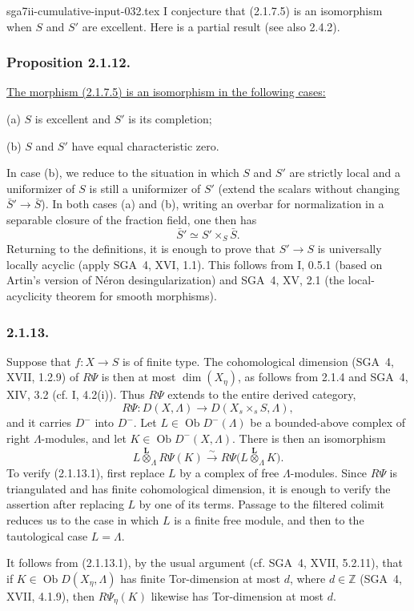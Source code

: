\begin{filecontents*}{sga7ii-cumulative-input-032.tex}
I conjecture that (2.1.7.5) is an isomorphism when $S$ and $S'$ are
excellent.  Here is a partial result (see also 2.4.2).

\subsubsection*{Proposition 2.1.12.}
\underline{The morphism (2.1.7.5) is an isomorphism in the following
cases:}

\medskip
\noindent(a) $S$ is excellent and $S'$ is its completion;

\noindent(b) $S$ and $S'$ have equal characteristic zero.

In case (b), we reduce to the situation in which $S$ and $S'$ are
strictly local and a uniformizer of $S$ is still a uniformizer of
$S'$ (extend the scalars without changing
$\bar S'\longrightarrow\bar S$).  In both cases (a) and (b), writing
an overbar for normalization in a separable closure of the fraction
field, one then has
\[
\bar S'\simeq S'\times_S\bar S.
\]
Returning to the definitions, it is enough to prove that
$S'\longrightarrow S$ is universally locally acyclic (apply SGA~4,
XVI, 1.1).  This follows from I, 0.5.1 (based on Artin's version of
N\'{e}ron desingularization) and SGA~4, XV, 2.1 (the local-acyclicity
theorem for smooth morphisms).

\subsubsection*{2.1.13.}
Suppose that $f:X\longrightarrow S$ is of finite type.  The
cohomological dimension (SGA~4, XVII, 1.2.9) of $R\Psi$ is then at most
$\dim(X_\eta)$, as follows from 2.1.4 and SGA~4, XIV, 3.2 (cf. I,
4.2(i)).  Thus $R\Psi$ extends to the entire derived category,
\[
R\Psi:D(X,\Lambda)\longrightarrow D(X_s\times_sS,\Lambda),
\]
and it carries $D^-$ into $D^-$.  Let
$L\in\operatorname{Ob}D^-(\Lambda)$ be a bounded-above complex of
right $\Lambda$-modules, and let
$K\in\operatorname{Ob}D^-(X,\Lambda)$.  There is then an isomorphism
\begin{equation}\tag{2.1.13.1}
L\overset{\mathbf L}{\otimes}_\Lambda R\Psi(K)
\xrightarrow{\ \sim\ }
R\Psi\bigl(L\overset{\mathbf L}{\otimes}_\Lambda K\bigr).
\end{equation}
To verify (2.1.13.1), first replace $L$ by a complex of free
$\Lambda$-modules.  Since $R\Psi$ is triangulated and has finite
cohomological dimension, it is enough to verify the assertion after
replacing $L$ by one of its terms.  Passage to the filtered colimit
reduces us to the case in which $L$ is a finite free module, and then
to the tautological case $L=\Lambda$.

It follows from (2.1.13.1), by the usual argument (cf. SGA~4, XVII,
5.2.11), that if $K\in\operatorname{Ob}D(X_\eta,\Lambda)$ has finite
Tor-dimension at most $d$, where $d\in\mathbb Z$ (SGA~4, XVII, 4.1.9),
then $R\Psi_\eta(K)$ likewise has Tor-dimension at most $d$.
\end{filecontents*}
